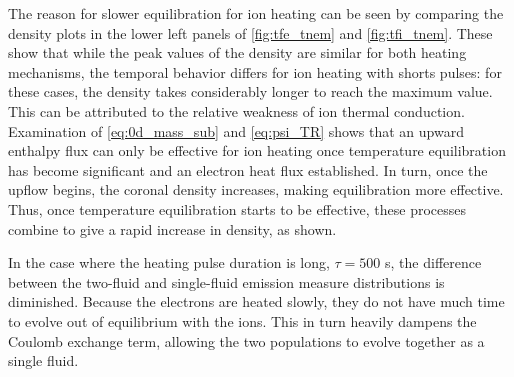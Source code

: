 \documentclass[apj]{emulateapj}
\begin{document}
	\par The reason for slower equilibration for ion heating can be seen by comparing the density plots in the lower left panels of \autoref{fig:tfe_tnem} and \autoref{fig:tfi_tnem}. These show that while the peak values of the density are similar for both heating mechanisms, the temporal behavior differs for ion heating with shorts pulses: for these cases, the density takes considerably longer to reach the maximum value. This can be attributed to the relative weakness of ion thermal conduction. Examination of \autoref{eq:0d_mass_sub} and \autoref{eq:psi_TR} shows that an upward enthalpy flux can only be effective for ion heating once temperature equilibration has become significant and an electron heat flux established. In turn, once the upflow begins, the coronal density increases, making equilibration more effective. Thus, once temperature equilibration starts to be effective, these processes combine to give a rapid increase in density, as shown.
	\par In the case where the heating pulse duration is long, $\tau=500$ s, the difference between the two-fluid and single-fluid emission measure distributions is diminished. Because the electrons are heated slowly, they do not have much time to evolve out of equilibrium with the ions. This in turn heavily dampens the Coulomb exchange term, allowing the two populations to evolve together as a single fluid.
\end{document}
